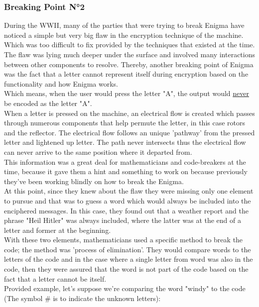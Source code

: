 \documentclass[conference,compsoc]{IEEEtran}
\begin{document}
\subsubsection{Breaking Point N°2}
During the WWII, many of the parties that were trying to break Enigma have noticed a simple but very big flaw in the encryption technique of the machine. Which was too difficult to fix provided by the techniques that existed at the time. The flaw was lying much deeper under the surface and involved many interactions between other components to resolve.
Thereby, another breaking point of Enigma was the fact that a letter cannot represent itself during encryption based on the functionality and how Enigma works.\\
Which means, when the user would press the letter "A", the output would \underline{never} be encoded as the letter "A".\\
When a letter is pressed on the machine, an electrical flow is created which passes through numerous components that help permute the letter, in this case rotors and the reflector.
The electrical flow follows an unique 'pathway' from the pressed letter and lightened up letter. The path never intersects thus the electrical flow can never arrive to the same position where it departed from.\\
This information was a great deal for mathematicians and code-breakers at the time, because it gave them a hint and something to work on because previously they've been working blindly on how to break the Enigma.\\
At this point, since they knew about the flaw they were missing only one element to pursue and that was to guess a word which would always be included into the enciphered messages. In this case, they found out that a weather report and the phrase "Heil Hitler" was always included, where the latter was at the end of a letter and former at the beginning.\\
With these two elements, mathematicians used a specific method to break the code; the method was 'process of elimination'. They would compare words to the letters of the code and in the case where a single letter from word was also in the code, then they were assured that the word is not part of the code based on the fact that a letter cannot be itself.\\

Provided example, let's suppose we're comparing the word "windy" to the code (The symbol \# is to indicate the unknown letters):\\
\end{document}
